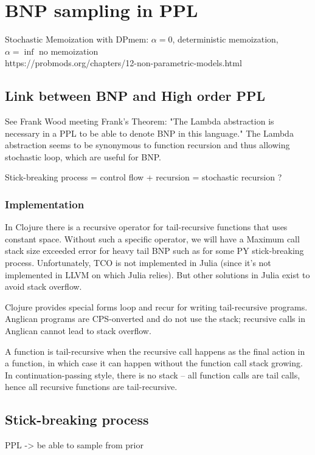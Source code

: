 
\chapter{BNP sampling in PPL}

Stochastic Memoization with DPmem: $\alpha = 0$, deterministic memoization, $\alpha = \inf$ no memoization\\
https://probmods.org/chapters/12-non-parametric-models.html


\section{Link between BNP and High order PPL}
See Frank Wood meeting
Frank's Theorem: "The Lambda abstraction is necessary in a PPL to be able to denote BNP in this language." The Lambda abstraction seems to be synonymous to function recursion and thus allowing stochastic loop, which are useful for BNP.

Stick-breaking process = control flow + recursion = stochastic recursion ?

\subsection{Implementation}
In Clojure there is a recursive operator for tail-recursive functions that uses constant space. Without such a specific operator, we will have a Maximum call stack size exceeded error for heavy tail BNP such as for some PY stick-breaking process. Unfortunately, \gls{TCO} is not implemented in Julia (since it's not implemented in LLVM on which Julia relies). But other solutions in Julia exist to avoid stack overflow.

Clojure provides special forms loop and recur for writing tail-recursive programs. Anglican programs are \gls{CPS}-onverted and do not use the stack; recursive calls in Anglican cannot lead to stack overflow.

A function is tail-recursive when the recursive call happens as the final action in a function, in which case it can happen without the function call stack growing. In continuation-passing style, there is no stack – all function calls are tail calls, hence all recursive functions are tail-recursive.

\section{Stick-breaking process}
PPL -> be able to sample from prior

